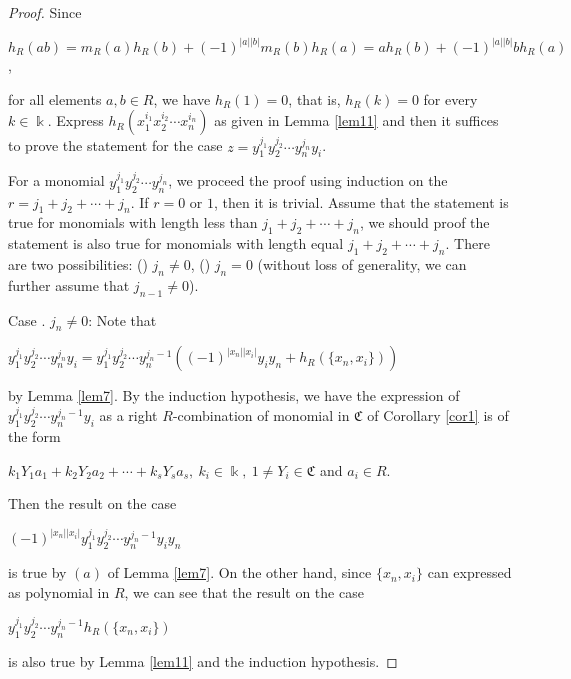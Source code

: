 \documentclass[a4paper,10pt]{amsart}
\theoremstyle{definition}
\theoremstyle{remark}
\numberwithin{equation}{section}
\begin{document}
\begin{proof}
Since
\begin{center}
$h_R(ab)=m_R(a)h_R(b)+(-1)^{|a||b|}m_R(b)h_R(a)=ah_R(b)+(-1)^{|a||b|}bh_R(a)$,
\end{center}
for all elements $a, b\in R$, we have $h_R(1)=0$, that is,
$h_R(k)=0$ for every $k\in \Bbbk$. Express
$h_R(x_1^{i_1}x_2^{i_2}\cdots x_n^{i_n})$ as given in Lemma \ref{lem11} and
then it suffices to prove the statement for the case
$z=y_1^{j_1}y_2^{j_2}\cdots y_n^{j_n}y_i$.

For a monomial $y_1^{j_1}y_2^{j_2}\cdots y_n^{j_n}$, we proceed the
proof using induction on the $r=j_1+j_2+\cdots+j_n$. If $r=0$ or $1$, then it
is trivial. Assume that the statement is true for monomials with
length less than $j_1+j_2+\cdots+j_n$, we should proof the statement is
also true for monomials with length equal $j_1+j_2+\cdots+j_n$. There are two possibilities: (\uppercase\expandafter{}) $j_n\neq 0$, (\uppercase\expandafter{}) $j_n=0$ (without loss of generality, we can further assume that $j_{n-1}\neq 0$).

Case \uppercase\expandafter{}. $j_n\neq 0$: Note that
\begin{center}
$y_1^{j_1}y_2^{j_2}\cdots y_n^{j_n}y_i=y_1^{j_1}y_2^{j_2}\cdots y_n^{j_n-1}((-1)^{|x_n||x_i|}y_iy_n+h_R(\{x_n,
x_i\}))$
\end{center}
by Lemma \ref{lem7}. By the induction hypothesis, we have the expression of
$y_1^{j_1}y_2^{j_2}\cdots y_n^{j_n-1}y_i$ as a right $R$-combination of
monomial in $\mathfrak{C}$ of Corollary \ref{cor1} is of the form
\begin{center}
$k_1Y_1a_1+k_2Y_2a_2+\cdots+k_sY_sa_s, ~k_i\in \Bbbk, ~1\neq
Y_i\in\mathfrak{C}$ and $a_i\in R$.
\end{center}
Then the result on the case
\begin{center}
$(-1)^{|x_n||x_i|}y_1^{j_1}y_2^{j_2}\cdots y_n^{j_n-1}y_iy_n$
\end{center}
is true by $(a)$ of Lemma \ref{lem7}. On the other hand, since $\{x_n,
x_i\}$ can expressed as polynomial in $R$, we can see that the result on
the case
\begin{center}
$y_1^{j_1}y_2^{j_2}\cdots y_n^{j_n-1}h_R(\{x_n, x_i\})$
\end{center}
is also true by Lemma \ref{lem11} and the induction hypothesis.


\end{proof}
\end{document}
